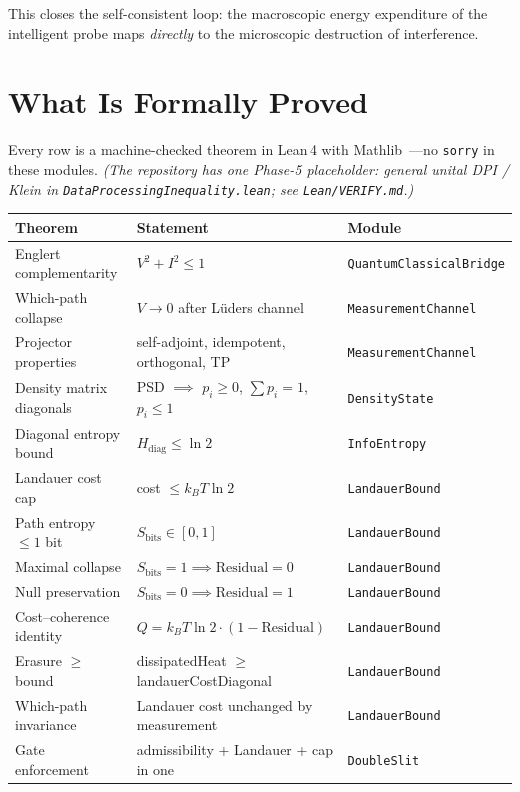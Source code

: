 \documentclass[10pt, a4paper]{article}
\begin{document}
This closes the self-consistent loop: the macroscopic energy expenditure of the intelligent probe maps \emph{directly} to the microscopic destruction of interference.

\section{What Is Formally Proved}

\noindent Every row is a machine-checked theorem in Lean\,4 with Mathlib~\cite{lean4, mathlib2020}---no \texttt{sorry} in these modules. \emph{(The repository has one Phase-5 placeholder: general unital DPI / Klein in \texttt{DataProcessingInequality.lean}; see \texttt{Lean/VERIFY.md}.)}

\vspace{0.15em}
{\footnotesize
\begin{tabular}{@{}lll@{}}
\toprule
\textbf{Theorem} & \textbf{Statement} & \textbf{Module} \\
\midrule
Englert complementarity & $V^2 + I^2 \le 1$ & \texttt{QuantumClassicalBridge} \\
Which-path collapse & $V \to 0$ after L\"uders channel & \texttt{MeasurementChannel} \\
Projector properties & self-adjoint, idempotent, orthogonal, TP & \texttt{MeasurementChannel} \\
Density matrix diagonals & PSD $\implies$ $p_i \ge 0$, $\sum p_i = 1$, $p_i \le 1$ & \texttt{DensityState} \\
Diagonal entropy bound & $H_{\text{diag}} \le \ln 2$ & \texttt{InfoEntropy} \\
Landauer cost cap & cost $\le k_B T \ln 2$ & \texttt{LandauerBound} \\
Path entropy $\le 1$ bit & $S_{\text{bits}} \in [0, 1]$ & \texttt{LandauerBound} \\
Maximal collapse & $S_{\text{bits}} = 1 \implies \text{Residual} = 0$ & \texttt{LandauerBound} \\
Null preservation & $S_{\text{bits}} = 0 \implies \text{Residual} = 1$ & \texttt{LandauerBound} \\
Cost--coherence identity & $Q = k_B T \ln 2 \cdot (1 - \text{Residual})$ & \texttt{LandauerBound} \\
Erasure $\ge$ bound & dissipatedHeat $\ge$ landauerCostDiagonal & \texttt{LandauerBound} \\
Which-path invariance & Landauer cost unchanged by measurement & \texttt{LandauerBound} \\
Gate enforcement & admissibility + Landauer + cap in one & \texttt{DoubleSlit} \\
\bottomrule
\end{tabular}}
\end{document}
